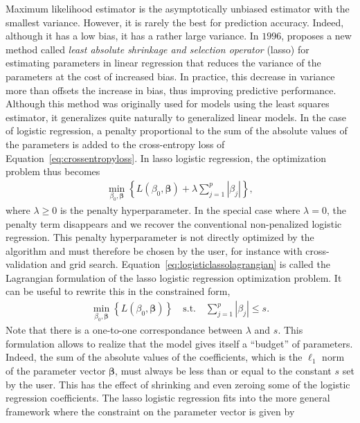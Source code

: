 \documentclass{article}
\begin{document}
Maximum likelihood estimator is the asymptotically unbiased estimator with the smallest variance. However, it is rarely the best for prediction accuracy. Indeed, although it has a low bias, it has a rather large variance. In $1996$, \cite{tibshirani1996regression} proposes a new method called \textit{least absolute shrinkage and selection operator} (lasso) for estimating parameters in linear regression that reduces the variance of the parameters at the cost of increased bias. In practice, this decrease in variance more than offsets the increase in bias, thus improving predictive performance. Although this method was originally used for models using the least squares estimator, it generalizes quite naturally to generalized linear models. In the case of logistic regression, a penalty proportional to the sum of the absolute values of the parameters is added to the cross-entropy loss of Equation~\ref{eq:crossentropyloss}. In lasso logistic regression, the optimization problem thus becomes
\begin{align}
    \min_{\beta_0, \boldsymbol{\beta}} \left\{L(\beta_0, \boldsymbol{\beta}) + \lambda \sum_{j = 1}^p |\beta_j|\right\},
    \label{eq:logisticlassolagrangian}
\end{align}
where $\lambda \ge 0$ is the penalty hyperparameter. In the special case where $\lambda = 0$, the penalty term disappears and we recover the conventional non-penalized logistic regression. This penalty hyperparameter is not directly optimized by the algorithm and must therefore be chosen by the user, for instance with cross-validation and grid search. Equation~\ref{eq:logisticlassolagrangian} is called the Lagrangian formulation of the lasso logistic regression optimization problem. It can be useful to rewrite this in the constrained form,
\begin{align}
    \min_{\beta_0, \boldsymbol{\beta}} \left\{L(\beta_0, \boldsymbol{\beta})\right\} \quad\text{s.t.}\quad \sum_{j = 1}^p |\beta_j| \le s.
    \label{eq:logisticlassoconstrained}
\end{align}
Note that there is a one-to-one correspondance between $\lambda$ and $s$. This formulation allows to realize that the model gives itself a ``budget'' of parameters. Indeed, the sum of the absolute values of the coefficients, which is the $\ell_1$ norm of the parameter vector $\boldsymbol{\beta}$, must always be less than or equal to the constant $s$ set by the user. This has the effect of shrinking and even zeroing some of the logistic regression coefficients. The lasso logistic regression fits into the more general framework where the constraint on the parameter vector is given by
\end{document}
